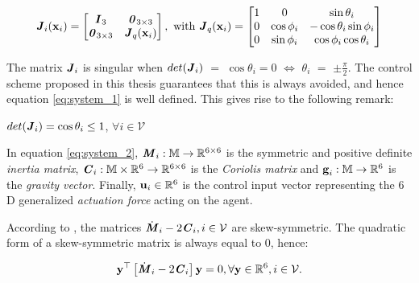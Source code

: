 \begin{equation}
  \bm{\mathit{J}}_i(\bm{\mathbf{x}}_i) =
  \begin{bmatrix}
    \bm{\mathit{I}}_3 & \bm{\mathit{0}}_{3 \times 3} \\
    \bm{\mathit{0}}_{3 \times 3} & \bm{\mathit{J}}_{ q }(\bm{\mathbf{x}}_i) \\
  \end{bmatrix} \notag, \text{ with }
  \bm{\mathit{J}}_q(\bm{\mathbf{x}}_i) =
  \begin{bmatrix}
    1 & 0 & \sin\theta_i \\
    0 & \cos\phi_i & -\cos\theta_i \sin\phi_i \\
    0 & \sin\phi_i & \cos\phi_i \cos\theta_i
  \end{bmatrix} \notag
\end{equation}

The matrix $\bm{\mathit{J}}_i$ is singular when $det(\bm{\mathit{J}}_i)$ $=$ $\cos\theta_i = 0$
$\Leftrightarrow$ $\theta_i$ $=$ $\pm \frac{\pi}{2}$. The control scheme
proposed in this thesis guarantees that this is always avoided, and hence
equation \eqref{eq:system_1} is well defined. This gives rise to the following
remark:

\begin{bw_box}
  \begin{remark}
    $det(\bm{\mathit{J}}_i) = \cos\theta_i \leq 1$, $\forall i \in \mathcal{V}$
  \end{remark}
\end{bw_box}



In equation \eqref{eq:system_2}, $\bm{\mathit{M}}_i:\mathbb{M} \to \mathbb{R}^{6\times6}$ is
the symmetric and positive definite \textit{inertia matrix},
$\bm{\mathit{C}}_i:\mathbb{M}\times\mathbb{R}^6 \to \mathbb{R}^{6\times6}$ is the
\textit{Coriolis matrix} and $\bm{\mathbf{g}}_i:\mathbb{M} \to \mathbb{R}^6$ is the
\textit{gravity vector}.
Finally, $\bm{\mathbf{u}}_i\in\mathbb{R}^6$ is the control input vector representing
the $6$D generalized \textit{actuation force} acting on the agent.



\begin{bw_box}
  \begin{remark}
    According to \cite{Murray:1994:MIR:561828}, the matrices
    $\dot{\bm{\mathit{M}}}_i - 2\bm{\mathit{C}}_i, i \in \mathcal{V}$ are skew-symmetric.
    The quadratic form of a skew-symmetric matrix is always equal to 0, hence:

    \begin{equation}
      \bm{\mathbf{y}}^\top \left[\dot{\bm{\mathit{M}}}_i - 2 \bm{\mathit{C}}_i\right]\bm{\mathbf{y}} = 0,
        \forall \bm{\mathbf{y}} \in \mathbb{R}^6, i \in \mathcal{V}.
    \label{eq:skew_symm}
    \end{equation}
  \end{remark}
\end{bw_box}

